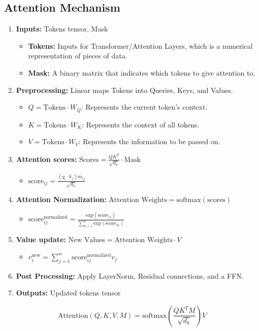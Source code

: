 \subsection{Attention Mechanism}
\begin{process}
    \begin{enumerate}
        \item \textbf{Inputs:} Tokens tensor, Mask
        \begin{itemize}
            \item \textbf{Tokens:} Inputs for Transformer/Attention Layers, which is a numerical representation of pieces of data.
            \item \textbf{Mask:} A binary matrix that indicates which tokens to give attention to.
        \end{itemize}
        \item \textbf{Preprocessing:} Linear maps Tokens into Queries, Keys, and Values.
        \begin{itemize}
            \item $Q = \text{Tokens} \cdot W_Q$: Represents the current token's context.
            \item $K = \text{Tokens} \cdot W_K$: Represents the context of all tokens.
            \item $V = \text{Tokens} \cdot W_V$: Represents the information to be passed on.
        \end{itemize}
        \item \textbf{Attention scores:} $\text{Scores} = \frac{QK^T}{\sqrt{d_k}} \cdot \text{Mask}$
        \begin{itemize}
            \item $\text{score}_{ij} = \frac{(q_i \cdot k_j) m_{ij}}{\sqrt{d_k}}$
        \end{itemize}
        \item \textbf{Attention Normalization:} $\text{Attention Weights} = \text{softmax}(\text{scores})$
        \begin{itemize}
            \item $\text{score}_{ij}^{\text{normalized}} = \frac{\text{exp}(\text{score}_{ij})}{\sum_{k=1}^n \text{exp}{(\text{score}_{ik})}}$
        \end{itemize}
        \item \textbf{Value update:} $\text{New Values} = \text{Attention Weights} \cdot V$
        \begin{itemize}
            \item $v_i^{\text{new}} = \sum_{j=1}^n \text{score}_{ij}^{\text{normalized}} v_j$
        \end{itemize}
        \item \textbf{Post Processing:} Apply LayerNorm, Residual connections, and a FFN.
        \item \textbf{Outputs:} Updated tokens tensor
    \end{enumerate}
    \begin{equation}
        \text{Attention}(Q, K, V, M) = \text{softmax}\left(\frac{QK^T M}{\sqrt{d_k}}\right)V
    \end{equation}

\end{process}


